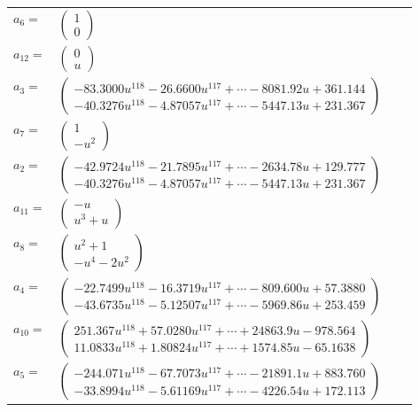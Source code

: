 \documentclass[1p]{elsarticle_modified}
\theoremstyle{definition}
\begin{document}
\begin{tabular}{m{7pt} m{180pt} m{7pt} m{180pt} }
\flushright $a_{6}=$&$\begin{pmatrix}1\\0\end{pmatrix}$ \\
\flushright $a_{12}=$&$\begin{pmatrix}0\\u\end{pmatrix}$ \\
\flushright $a_{3}=$&$\begin{pmatrix}-83.3000 u^{118}-26.6600 u^{117}+\cdots-8081.92 u+361.144\\-40.3276 u^{118}-4.87057 u^{117}+\cdots-5447.13 u+231.367\end{pmatrix}$ \\
\flushright $a_{7}=$&$\begin{pmatrix}1\\- u^2\end{pmatrix}$ \\
\flushright $a_{2}=$&$\begin{pmatrix}-42.9724 u^{118}-21.7895 u^{117}+\cdots-2634.78 u+129.777\\-40.3276 u^{118}-4.87057 u^{117}+\cdots-5447.13 u+231.367\end{pmatrix}$ \\
\flushright $a_{11}=$&$\begin{pmatrix}- u\\u^3+u\end{pmatrix}$ \\
\flushright $a_{8}=$&$\begin{pmatrix}u^2+1\\- u^4-2 u^2\end{pmatrix}$ \\
\flushright $a_{4}=$&$\begin{pmatrix}-22.7499 u^{118}-16.3719 u^{117}+\cdots-809.600 u+57.3880\\-43.6735 u^{118}-5.12507 u^{117}+\cdots-5969.86 u+253.459\end{pmatrix}$ \\
\flushright $a_{10}=$&$\begin{pmatrix}251.367 u^{118}+57.0280 u^{117}+\cdots+24863.9 u-978.564\\11.0833 u^{118}+1.80824 u^{117}+\cdots+1574.85 u-65.1638\end{pmatrix}$ \\
\flushright $a_{5}=$&$\begin{pmatrix}-244.071 u^{118}-67.7073 u^{117}+\cdots-21891.1 u+883.760\\-33.8994 u^{118}-5.61169 u^{117}+\cdots-4226.54 u+172.113\end{pmatrix}$ \\

\end{tabular}
\end{document}
